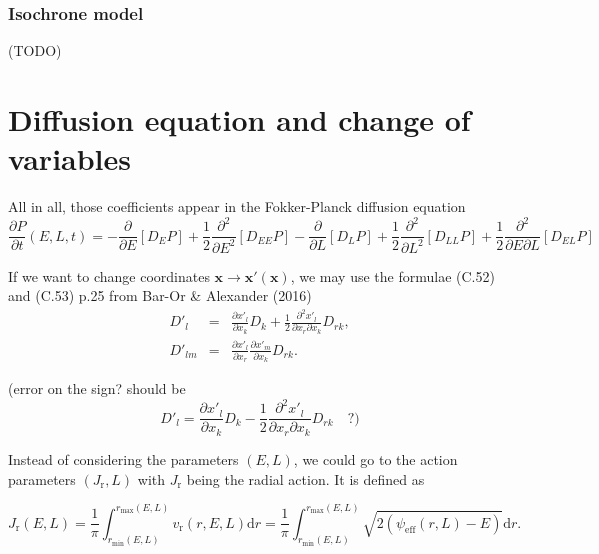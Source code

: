 \documentclass[11pt]{article}
\newcommand{\rr}{\mathrm{r}}
\newcommand{\vr}{v_{\rr}}
\newcommand{\rd}{{\mathrm{d}}}
\newcommand{\dE}{D_{E}}
\newcommand{\dL}{D_{L}}
\newcommand{\dEE}{D_{EE}}
\newcommand{\dLL}{D_{LL}}
\newcommand{\dEL}{D_{EL}}
\newcommand{\rmax}{r_{\max}}
\newcommand{\rmin}{r_{\min}}
\newcommand{\psieff}{\psi_{\mathrm{eff}}}
\newcommand{\bx}{\boldsymbol{x}}
\newcommand{\xp}{x'}
\newcommand{\bxp}{\boldsymbol{\xp}}
\newcommand{\Jr}{J_{\mathrm{r}}}
\begin{document}
\subsubsection{Isochrone model}
\label{subsubsec:IsochroneOrbitStudy}

(TODO)

\section{Diffusion equation and change of variables}
\label{sec:diffEq_changeVar}

All in all, those coefficients appear in the Fokker-Planck diffusion
equation
\begin{equation}
\frac{\partial P}{\partial t}(E,L,t)=-\frac{\partial}{\partial E}\left[\dE P\right]+\frac{1}{2}\frac{\partial^{2}}{\partial E^{2}}\left[\dEE P\right]-\frac{\partial}{\partial L}\left[\dL P\right]+\frac{1}{2}\frac{\partial^{2}}{\partial L^{2}}\left[\dLL P\right]+\frac{1}{2}\frac{\partial^{2}}{\partial E\partial L}\left[\dEL P\right]
\label{eq:FP:equation}
\end{equation}

If we want to change coordinates $\bx\rightarrow\bxp(\bx)$,
we may use the formulae (C.52) and (C.53) p.25 from Bar-Or \& Alexander
(2016)
\begin{equation}
\begin{array}{ccl}
  D'_{l} & =& \displaystyle{\frac{\partial \xp_{l}}{\partial x_{k}}D_{k}+\frac{1}{2}\frac{\partial^{2}\xp_{l}}{\partial x_{r}\partial x_{k}}D_{rk}} ,\\
  
 D'_{lm} & =&\displaystyle{\frac{\partial \xp_{l}}{\partial x_{r}}\frac{\partial \xp_{m}}{\partial x_{k}}D_{rk}} .
\end{array}
\label{eq:change_var_DiffCoeffs}
\end{equation}


(error on the sign? should be
\[
D'_{l}=\frac{\partial \xp_{l}}{\partial x_{k}}D_{k}-\frac{1}{2}\frac{\partial^{2}\xp_{l}}{\partial x_{r}\partial x_{k}}D_{rk}\quad?)
\]

Instead of considering the parameters $(E,L)$, we could go to the action parameters $(\Jr,L)$ with $\Jr$ being the radial action. It is defined as

\begin{equation}
  \Jr(E,L) = \frac{1}{\pi} \int_{\rmin(E,L)}^{\rmax(E,L)}\vr(r,E,L)\rd r =  \frac{1}{\pi} \int_{\rmin(E,L)}^{\rmax(E,L)} \sqrt{2(\psieff(r,L)-E)}\rd r.
  \label{eq:Radial_action}
  \end{equation}
\end{document}
